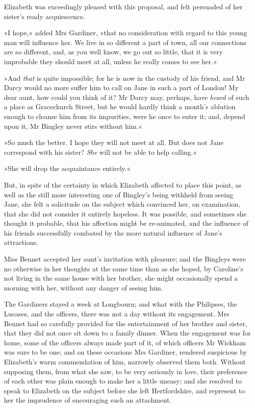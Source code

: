Elizabeth was exceedingly pleased with this proposal, and felt persuaded of her sister's ready acquiescence.

»I hope,« added Mrs Gardiner, »that no consideration with regard to this young man will influence her. We live in so different a part of town, all our connections are so different, and, as you well know, we go out so little, that it is very improbable they should meet at all, unless he really comes to see her.«

»And \textit{that} is quite impossible; for he is now in the custody of his friend, and Mr Darcy would no more suffer him to call on Jane in such a part of London! My dear aunt, how could you think of it? Mr Darcy may, perhaps, have \textit{heard} of such a place as Gracechurch Street, but he would hardly think a month's ablution enough to cleanse him from its impurities, were he once to enter it; and, depend upon it, Mr Bingley never stirs without him.«

»So much the better. I hope they will not meet at all. But does not Jane correspond with his sister? \textit{She} will not be able to help calling.«

»She will drop the acquaintance entirely.«

But, in spite of the certainty in which Elizabeth affected to place this point, as well as the still more interesting one of Bingley's being withheld from seeing Jane, she felt a solicitude on the subject which convinced her, on examination, that she did not consider it entirely hopeless. It was possible, and sometimes she thought it probable, that his affection might be re-animated, and the influence of his friends successfully combated by the more natural influence of Jane's attractions.

Miss Bennet accepted her aunt's invitation with pleasure; and the Bingleys were no otherwise in her thoughts at the same time than as she hoped, by Caroline's not living in the same house with her brother, she might occasionally spend a morning with her, without any danger of seeing him.

The Gardiners stayed a week at Longbourn; and what with the Philipses, the Lucases, and the officers, there was not a day without its engagement. Mrs Bennet had so carefully provided for the entertainment of her brother and sister, that they did not once sit down to a family dinner. When the engagement was for home, some of the officers always made part of it, of which officers Mr Wickham was sure to be one; and on these occasions Mrs Gardiner, rendered suspicious by Elizabeth's warm commendation of him, narrowly observed them both. Without supposing them, from what she saw, to be very seriously in love, their preference of each other was plain enough to make her a little uneasy; and she resolved to speak to Elizabeth on the subject before she left Hertfordshire, and represent to her the imprudence of encouraging such an attachment.

